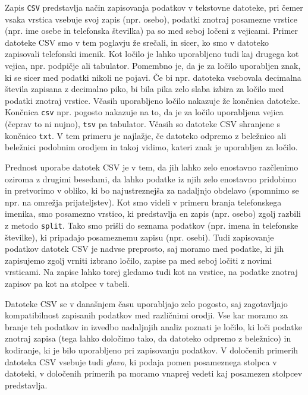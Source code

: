 Zapis \texttt{CSV}  predstavlja način zapisovanja podatkov v tekstovne datoteke, pri čemer vsaka vrstica vsebuje svoj zapis (npr. osebo), podatki znotraj posamezne vrstice (npr. ime osebe in telefonska številka) pa so med seboj ločeni z vejicami. Primer datoteke CSV smo v tem poglavju že srečali, in sicer, ko smo v datoteko zapisovali telefonski imenik. Kot ločilo je lahko uporabljeno tudi kaj drugega kot vejica, npr. podpičje ali tabulator. Pomembno je, da je za ločilo uporabljen znak, ki se sicer med podatki nikoli ne pojavi. Če bi npr. datoteka vsebovala decimalna števila zapisana z decimalno piko, bi bila pika zelo slaba izbira za ločilo med podatki znotraj vrstice. Včasih uporabljeno ločilo nakazuje že končnica datoteke. Končnica \texttt{csv} npr. pogosto nakazuje na to, da je za ločilo uporabljena vejica  (čeprav to ni nujno), \texttt{tsv} pa tabulator. Včasih so datoteke CSV shranjene s končnico \texttt{txt}. V tem primeru je najlažje, če datoteko odpremo z beležnico ali beležnici podobnim orodjem in takoj vidimo, kateri znak je uporabljen za ločilo. 

Prednost uporabe datotek CSV je v tem, da jih lahko zelo enostavno razčlenimo  oziroma z drugimi besedami, da lahko podatke iz njih zelo enostavno pridobimo in pretvorimo v obliko, ki bo najustreznejša za nadaljnjo obdelavo (spomnimo se npr. na omrežja prijateljstev). Kot smo videli v primeru branja telefonskega imenika, smo posamezno vrstico, ki predstavlja en zapis (npr. osebo) zgolj razbili z metodo \texttt{split}. Tako smo prišli do seznama podatkov (npr. imena in telefonske številke), ki pripadajo posameznemu zapisu (npr. osebi). Tudi zapisovanje podatkov datotek CSV je nadvse preprosto, saj moramo med podatke, ki jih zapisujemo zgolj vrniti izbrano ločilo, zapise pa med seboj ločiti z novimi vrsticami. Na zapise lahko torej gledamo tudi kot na vrstice, na podatke znotraj zapisov pa kot na stolpce v tabeli. 

Datoteke CSV se v današnjem času uporabljajo zelo pogosto, saj zagotavljajo kompatibilnost zapisanih podatkov med različnimi orodji. Vse kar moramo za branje teh podatkov in izvedbo nadaljnjih analiz poznati je ločilo, ki loči podatke znotraj zapisa (tega lahko določimo tako, da datoteko odpremo z beležnico) in kodiranje, ki je bilo uporabljeno pri zapisovanju podatkov. V določenih primerih datoteka CSV vsebuje tudi \emph{glavo}, ki podaja pomen posameznega stolpca v datoteki, v določenih primerih pa moramo vnaprej vedeti kaj posamezen stolpcev predstavlja. 

